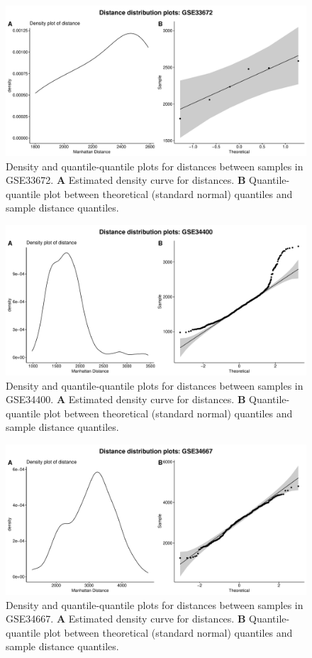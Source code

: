 \documentclass[10pt,letterpaper]{article}\usepackage[]{graphicx}\usepackage[]{color}
\begin{document}
\begin{figure}[H]
	\includegraphics[width=\textwidth]{manhattan-distance_hist_GSE33672.pdf}
	\caption{Density and quantile-quantile plots for distances between samples in GSE33672. \textbf{A} Estimated density curve for distances. \textbf{B} Quantile-quantile plot between theoretical (standard normal) quantiles and sample distance quantiles.}
\end{figure}

\begin{figure}[H]
	\includegraphics[width=\textwidth]{manhattan-distance_hist_GSE34400.pdf}
	\caption{Density and quantile-quantile plots for distances between samples in GSE34400. \textbf{A} Estimated density curve for distances. \textbf{B} Quantile-quantile plot between theoretical (standard normal) quantiles and sample distance quantiles.}
\end{figure}

\begin{figure}[H]
	\includegraphics[width=\textwidth]{manhattan-distance_hist_GSE34667.pdf}
	\caption{Density and quantile-quantile plots for distances between samples in GSE34667. \textbf{A} Estimated density curve for distances. \textbf{B} Quantile-quantile plot between theoretical (standard normal) quantiles and sample distance quantiles.}
\end{figure}
\end{document}
